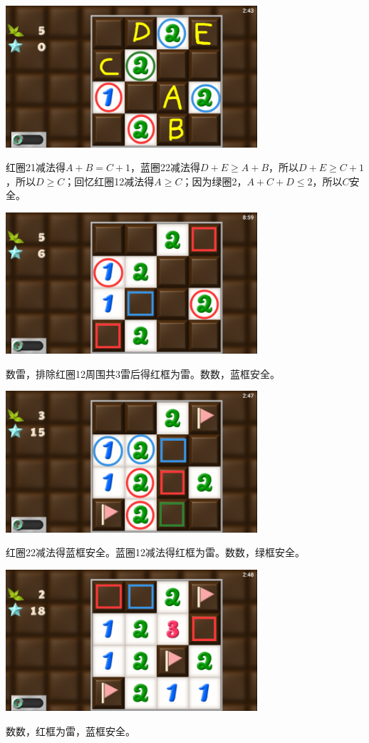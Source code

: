 \subsection{} %
\begin{center}
    \includegraphics[width=0.7\textwidth]{puzzle/151-1.png}
\end{center}
红圈21减法得$A+B=C+1$，蓝圈22减法得$D+E\ge A+B$，所以$D+E\ge C+1$，所以$D\ge C$；回忆红圈12减法得$A\ge C$；因为绿圈2，$A+C+D\le 2$，所以$C$安全。
\begin{center}
    \includegraphics[width=0.7\textwidth]{puzzle/151-2.png}
\end{center}
数雷，排除红圈12周围共3雷后得红框为雷。数数，蓝框安全。
\begin{center}
    \includegraphics[width=0.7\textwidth]{puzzle/151-3.png}
\end{center}
红圈22减法得蓝框安全。蓝圈12减法得红框为雷。数数，绿框安全。
\begin{center}
    \includegraphics[width=0.7\textwidth]{puzzle/151-4.png}
\end{center}
数数，红框为雷，蓝框安全。

